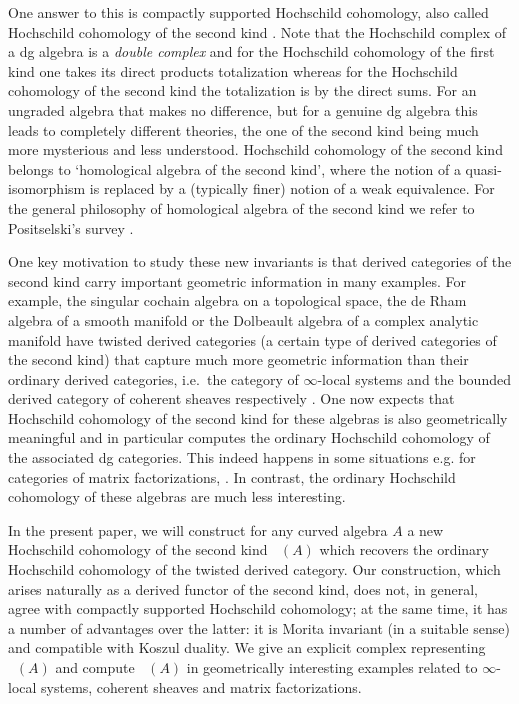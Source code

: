 \documentclass[a4paper]{amsart}
\theoremstyle{plain}
\theoremstyle{definition}
\theoremstyle{remark}
\DeclareMathOperator{\HHIIc}{\mathcal{HC}^{\mathrm{II}}}%
\numberwithin{equation}{section}
\theoremstyle{plain}
\begin{document}
	One answer to this is compactly supported Hochschild cohomology, also called Hochschild cohomology of the second kind \cite{pp12, caldararu2013curved}.
	Note that the  Hochschild complex of a dg algebra is a \emph{double complex} and for the Hochschild cohomology of the first kind one takes its direct products totalization whereas for the Hochschild cohomology of the second kind the totalization is by the direct sums. For an ungraded algebra that makes no difference, but for a genuine dg algebra this leads to completely different theories, the one of the second kind being much more mysterious and less understood. 
	Hochschild cohomology of the second kind belongs to `homological algebra of the second kind', where the notion of a quasi-isomorphism is replaced by a (typically finer) notion of a weak equivalence. 
	For the general philosophy of homological algebra of the second kind we refer to Positselski's survey \cite{Positselski23}. 

	One key motivation to study these new invariants is that derived categories of the second kind carry important geometric information in many examples.
	For example, the singular cochain algebra on a topological space, the de Rham algebra of a smooth manifold or the Dolbeault algebra of a complex analytic manifold have twisted derived categories (a certain type of derived categories of the second kind) that capture much more geometric information than their ordinary derived categories, i.e.\ the category of $\infty$-local systems and the bounded derived category of coherent sheaves respectively \cite{chl21, blo10}. 
	One now expects that Hochschild cohomology of the second kind for these algebras is also geometrically meaningful and in particular computes the ordinary Hochschild cohomology of the associated dg categories. This indeed happens in some situations e.g. for categories of matrix factorizations, \cite{pp12}. In contrast, the ordinary Hochschild cohomology of these algebras are much less interesting.
	
	 
	 
	 In the present paper, we will construct for any curved algebra $A$ a new Hochschild cohomology of the second kind $\HHIIc(A)$ which recovers the ordinary Hochschild cohomology of the twisted derived category.
	 Our construction, which arises naturally as a derived functor of the second kind, does not, in general, agree with compactly supported Hochschild cohomology; at the same time, it has a number of advantages over the latter: it is Morita invariant (in a suitable sense) and compatible with Koszul duality. We give an explicit complex representing $\HHIIc(A)$ and compute $\HHIIc(A)$  in geometrically interesting examples related to $\infty$-local systems, coherent sheaves and matrix factorizations.
	
\end{document}

